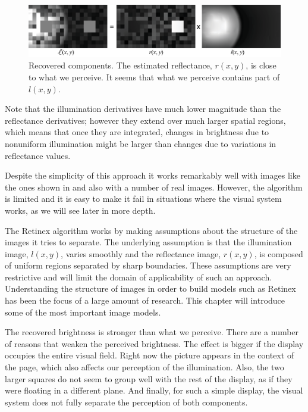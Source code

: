 \begin{figure}[h]
	\centerline{
		\includegraphics[width=1\linewidth]{figures/statistical_image_models/retinex_solution_a.eps}
	}
	\caption{Recovered components. The estimated reflectance, $r(x,y)$, is close to what we perceive. It seems that what we perceive contains part of $l(x,y)$.}
	\label{fig:simultaneous3}
\end{figure}

Note that the illumination derivatives have much lower magnitude than the reflectance derivatives; however they extend over much larger spatial regions, which means that once they are integrated, changes in brightness due to nonuniform illumination might be larger than changes due to variations in reflectance values.

Despite the simplicity of this approach it works remarkably well with images like the ones shown in \fig{\ref{fig:simultaneous}} and also with a number of real images. However, the algorithm is limited and it is easy to make it fail in situations where the visual system works, as we will see later in more depth.

The Retinex algorithm works by making assumptions about the structure of the images it tries to separate. The underlying assumption is that the illumination image, $l(x,y)$, varies smoothly and the reflectance image, $r(x,y)$, is composed of uniform regions separated by sharp boundaries. These assumptions are very restrictive and will limit the domain of applicability of such an approach. Understanding the structure of images in order to build models such as Retinex has been the focus of a large amount of research. This chapter will introduce some of the most important image models.

The recovered brightness is stronger than what we perceive. There are a number of reasons that weaken the perceived brightness. The effect is bigger if the display occupies the entire visual field. Right now the picture appears in the context of the page, which also affects our perception of the illumination. Also, the two larger squares do not seem to group well with the rest of the display, as if they were floating in a different plane. And finally, for such a simple display, the visual system does not fully separate the perception of both components.

